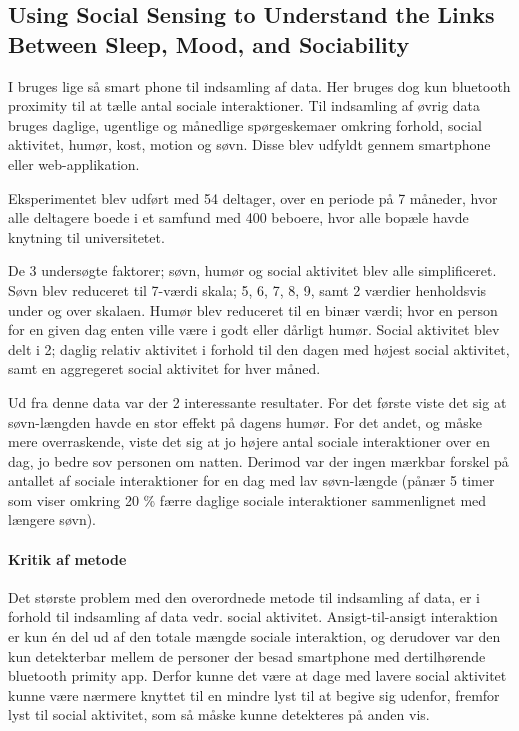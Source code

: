 \subsection{Using Social Sensing to Understand the Links Between Sleep, Mood, and Sociability}
I \citet{social_sensing_2} bruges lige så smart phone til indsamling af data.
Her bruges dog kun bluetooth proximity til at tælle antal sociale interaktioner.
Til indsamling af øvrig data bruges daglige, ugentlige og månedlige spørgeskemaer omkring forhold, social aktivitet, humør, kost, motion og søvn.
Disse blev udfyldt gennem smartphone eller web-applikation.

Eksperimentet blev udført med 54 deltager, over en periode på 7 måneder, hvor alle deltagere boede i et samfund med 400 beboere, hvor alle bopæle havde knytning til universitetet.

De 3 undersøgte faktorer; søvn, humør og social aktivitet blev alle simplificeret.
Søvn blev reduceret til 7-værdi skala; 5, 6, 7, 8, 9, samt 2 værdier henholdsvis under og over skalaen.
Humør blev reduceret til en binær værdi; hvor en person for en given dag enten ville være i godt eller dårligt humør.
Social aktivitet blev delt i 2; daglig relativ aktivitet i forhold til den dagen med højest social aktivitet, samt en aggregeret social aktivitet for hver måned.

Ud fra denne data var der 2 interessante resultater.
For det første viste det sig at søvn-længden havde en stor effekt på dagens humør.
For det andet, og måske mere overraskende, viste det sig at jo højere antal sociale interaktioner over en dag, jo bedre sov personen om natten.
Derimod var der ingen mærkbar forskel på antallet af sociale interaktioner for en dag med lav søvn-længde (pånær 5 timer som viser omkring 20 \% færre daglige sociale interaktioner sammenlignet med længere søvn).

\paragraph{Kritik af metode}
Det største problem med den overordnede metode til indsamling af data, er i forhold til indsamling af data vedr. social aktivitet.
Ansigt-til-ansigt interaktion er kun én del ud af den totale mængde sociale interaktion, og derudover var den kun detekterbar mellem de personer der besad smartphone med dertilhørende bluetooth primity app.
Derfor kunne det være at dage med lavere social aktivitet kunne være nærmere knyttet til en mindre lyst til at begive sig udenfor, fremfor lyst til social aktivitet, som så måske kunne detekteres på anden vis.

